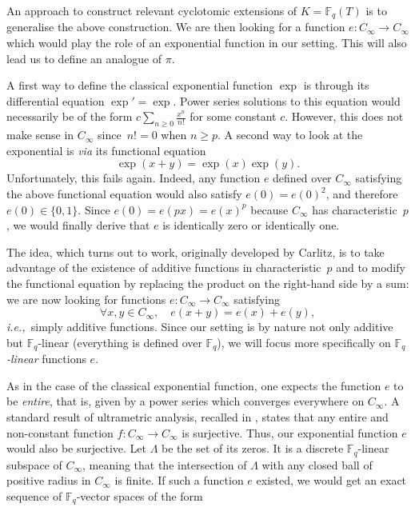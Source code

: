 \documentclass[11pt]{article}
\theoremstyle{definition}
\renewcommand\geq{\geqslant}
\newcommand\Fq{\mathbb{F}_q}
\newcommand{\Cinf}{C_{\infty}}
\newcommand{\ie}{\textit{i.e.,~}}
\begin{document}
An approach to construct relevant cyclotomic extensions of $K=\Fq(T)$ is to generalise the above construction. We are then looking for a function $e: \Cinf \rightarrow \Cinf$ which would play the role of an exponential function in our setting. This will also lead us to define an analogue of $\pi$.

A first way to define the classical exponential function $\exp$ is through its differential equation $\exp' = \exp$. Power series solutions 
to this equation would necessarily be of the form $c\sum_{n\geq0} \frac{x^n}{n!}$ for some constant $c$. However, this does not make sense in $\Cinf$ 
since~$n! = 0$ when $n\geq p$.
A second way to look at the exponential is \emph{via} its functional equation 
$$\exp(x+y)=\exp(x)\exp(y).$$
Unfortunately, this fails again. Indeed, any function $e$ defined over $\Cinf$ satisfying 
the above functional equation would also satisfy $e(0)=e(0)^2$, and therefore $e(0) \in\{0,1\}$. 
Since $e(0)=e(px)=e(x)^p$ because $\Cinf$ has characteristic~$p$, 
we would finally derive that $e$ is identically zero or identically one.

The idea, which turns out to work, originally developed by Carlitz, is to take advantage of the existence of additive functions in characteristic~$p$ and to modify the functional equation by replacing the product on the right-hand side by a sum: we are now
looking for functions $e : \Cinf \to \Cinf$ satisfying
$$\forall x, y \in \Cinf, \quad e(x+y) = e(x) + e(y),$$
\ie simply additive functions. Since our setting is by nature 
not only additive but $\Fq$-linear (everything is defined over
$\Fq$), we will focus more specifically on \emph{$\Fq$-linear} 
functions $e$.

As in the case of the classical exponential function, one expects the function $e$ to be \emph{entire}, that is, given by a power series which converges everywhere on $\Cinf$. 
A standard result of ultrametric analysis, recalled in \cite[Proposition~2.7.12]{Pap23}, states that any entire and non-constant function $f:\Cinf \to \Cinf$ is surjective. Thus, our exponential function $e$ would also be surjective.  
Let $\Lambda$ be the set of its zeros. It is a discrete $\Fq$-linear subspace of 
$\Cinf$, meaning that the intersection of $\Lambda$ with any closed ball of positive radius in $\Cinf$ is finite. If such a function $e$ existed, we would get an exact sequence of $\Fq$-vector spaces of the form
\end{document}
